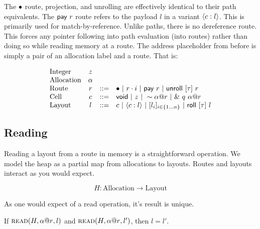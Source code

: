 The $\bullet$ route, projection, and unrolling are effectively identical to their path equivalents.
The $\mathsf{pay}~{r}$ route refers to the payload $l$ in a variant $\langle{{c}:{l}}\rangle$.
This is primarily used for match-by-reference.
Unlike paths, there is no dereference route.
This forces any pointer following into path evaluation (into routes)
rather than doing so while reading memory at a route.
The address placeholder from before is simply a pair of an allocation label and a route.
That is:

\[
\begin{array}{lccl}
\textrm{Integer} & z & & \\
\textrm{Allocation} & \alpha & & \\
\textrm{Route} & r & ::= & \bullet ~|~ {r}\cdot{i} ~|~ \mathsf{pay}~{r} ~|~ \mathsf{unroll}~[{\tau}]~{r} \\
\textrm{Cell} & c & ::= & \mathsf{void} ~|~ z ~|~ 
			      \sim{{\alpha}@{r}} ~|~ \&~{{q}~{{\alpha}@{r}}} \\
\textrm{Layout} & l & ::= & c ~|~ \langle{{c}:{l}}\rangle ~|~ 
			       [{{l}_{i}}]_{{i} \in \{1 \ldots {n}\} } ~|~ \mathsf{roll}~[{\tau}]~{l} \\
\end{array}
\]

\subsection*{Reading}

Reading a layout from a route in memory is a straightforward operation.
We model the heap as a partial map from allocations to layouts.
Routes and layouts interact as you would expect.

$$ H : \mathrm{Allocation} \to \mathrm{Layout} $$



As one would expect of a read operation, it's result is unique.

\begin{lem}
  If $\textsc{read}({H},{{\alpha}@{r}},{l})$ and $\textsc{read}({H},{{\alpha}@{r}},{l'})$, then $l = l'$.
\end{lem}

